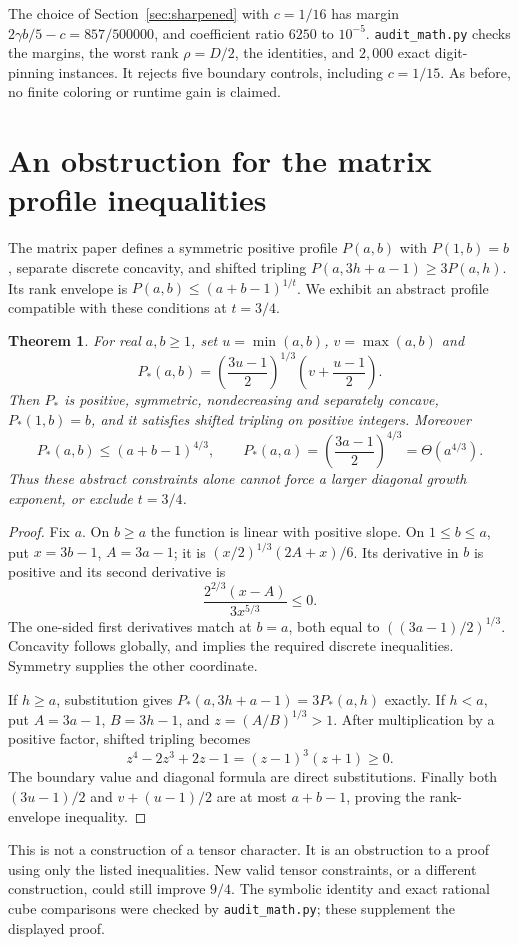 \documentclass[11pt]{article}
\newtheorem{theorem}{Theorem}
\begin{document}
The choice of Section~\ref{sec:sharpened} with $c=1/16$ has margin
$2\gamma b/5-c=857/500000$, and coefficient ratio $6250$ to $10^{-5}$.
\texttt{audit\_math.py} checks the margins, the worst rank $\rho=D/2$,
the identities, and $2{,}000$ exact digit-pinning instances. It rejects
five boundary controls, including $c=1/15$. As before, no finite coloring
or runtime gain is claimed.

\section{An obstruction for the matrix profile inequalities}
The matrix paper defines a symmetric positive profile $P(a,b)$ with
$P(1,b)=b$, separate discrete concavity, and shifted tripling
$P(a,3h+a-1)\ge3P(a,h)$. Its rank envelope is
$P(a,b)\le(a+b-1)^{1/t}$. We exhibit an abstract profile compatible with
these conditions at $t=3/4$.

\begin{theorem}\label{thm:barrier}
For real $a,b\ge1$, set $u=\min(a,b)$, $v=\max(a,b)$ and
\[
 P_*(a,b)=\left(\frac{3u-1}{2}\right)^{1/3}
                      \left(v+\frac{u-1}{2}\right).
\]
Then $P_*$ is positive, symmetric, nondecreasing and separately concave,
$P_*(1,b)=b$, and it satisfies shifted tripling on positive integers.
Moreover
\[
 P_*(a,b)\le(a+b-1)^{4/3},\qquad
 P_*(a,a)=\left(\frac{3a-1}{2}\right)^{4/3}=\Theta(a^{4/3}).
\]
Thus these abstract constraints alone cannot force a larger diagonal
growth exponent, or exclude $t=3/4$.
\end{theorem}
\begin{proof}
Fix $a$. On $b\ge a$ the function is linear with positive slope.
On $1\le b\le a$, put $x=3b-1$, $A=3a-1$; it is
$(x/2)^{1/3}(2A+x)/6$. Its derivative in $b$ is positive and its
second derivative is
\[
 \frac{2^{2/3}(x-A)}{3x^{5/3}}\le0.
\]
The one-sided first derivatives match at $b=a$, both equal to
$((3a-1)/2)^{1/3}$. Concavity follows globally, and implies the required
discrete inequalities. Symmetry supplies the other coordinate.

If $h\ge a$, substitution gives
$P_*(a,3h+a-1)=3P_*(a,h)$ exactly. If $h<a$, put
$A=3a-1$, $B=3h-1$, and $z=(A/B)^{1/3}>1$.
After multiplication by a positive factor, shifted tripling becomes
\[
 z^4-2z^3+2z-1=(z-1)^3(z+1)\ge0.
\]
The boundary value and diagonal formula are direct substitutions.
Finally both $(3u-1)/2$ and $v+(u-1)/2$ are at most $a+b-1$,
proving the rank-envelope inequality.
\end{proof}
This is not a construction of a tensor character. It is an obstruction
to a proof using only the listed inequalities. New valid tensor
constraints, or a different construction, could still improve $9/4$.
The symbolic identity and exact rational cube comparisons were checked
by \texttt{audit\_math.py}; these supplement the displayed proof.
\end{document}
